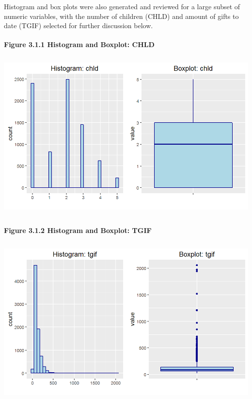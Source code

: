 \documentclass[]{article}
\let\oldparagraph\paragraph
\renewcommand{\paragraph}[1]{\oldparagraph{#1}\mbox{}}
\begin{document}
Histogram and box plots were also generated and reviewed for a large
subset of numeric variables, with the number of children (CHLD) and
amount of gifts to date (TGIF) selected for further discussion below.

\newpage

\paragraph{Figure 3.1.1 Histogram and Boxplot:
CHLD}\label{figure-3.1.1-histogram-and-boxplot-chld}

\includegraphics[height=3.33333in]{images/expl_num_chld.png}

\paragraph{Figure 3.1.2 Histogram and Boxplot:
TGIF}\label{figure-3.1.2-histogram-and-boxplot-tgif}

\includegraphics[height=3.33333in]{images/expl_num_tgif.png}
\end{document}
